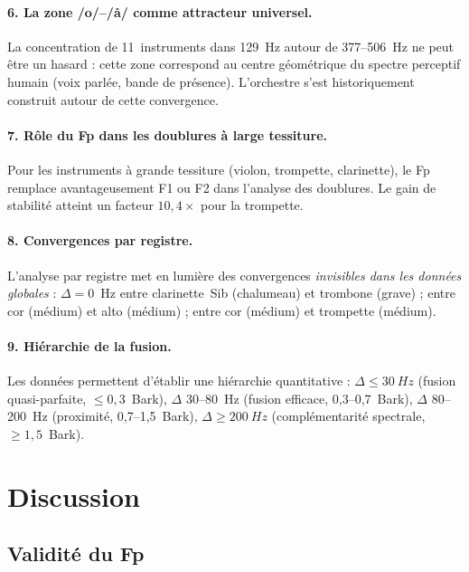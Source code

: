 \documentclass[11pt,a4paper]{article}
\begin{document}
\paragraph{6. La zone /o/--/\r{a}/ comme attracteur universel.}
La concentration de 11~instruments dans 129~Hz autour de
377--\SI{506}{Hz} ne peut être un hasard : cette zone correspond au
centre géométrique du spectre perceptif humain (voix parlée, bande de
présence). L'orchestre s'est historiquement construit autour de cette
convergence.

\paragraph{7. Rôle du Fp dans les doublures à large tessiture.}
Pour les instruments à grande tessiture (violon, trompette, clarinette),
le Fp remplace avantageusement F1 ou F2 dans l'analyse des doublures.
Le gain de stabilité atteint un facteur $10{,}4\times$ pour la
trompette.

\paragraph{8. Convergences par registre.}
L'analyse par registre met en lumière des convergences
\emph{invisibles dans les données globales} : $\Delta = 0$~Hz entre
clarinette~Sib (chalumeau) et trombone (grave) ; entre cor (médium)
et alto (médium) ; entre cor (médium) et trompette (médium).

\paragraph{9. Hiérarchie de la fusion.}
Les données permettent d'établir une hiérarchie quantitative :
$\Delta \leq \SI{30}{Hz}$ (fusion quasi-parfaite, $\leq 0{,}3$~Bark),
$\Delta$ 30--\SI{80}{Hz} (fusion efficace, 0,3--0,7~Bark),
$\Delta$ 80--\SI{200}{Hz} (proximité, 0,7--1,5~Bark),
$\Delta \geq \SI{200}{Hz}$ (complémentarité spectrale, $\geq
1{,}5$~Bark).


\section{Discussion}

\subsection{Validité du Fp}
\end{document}

